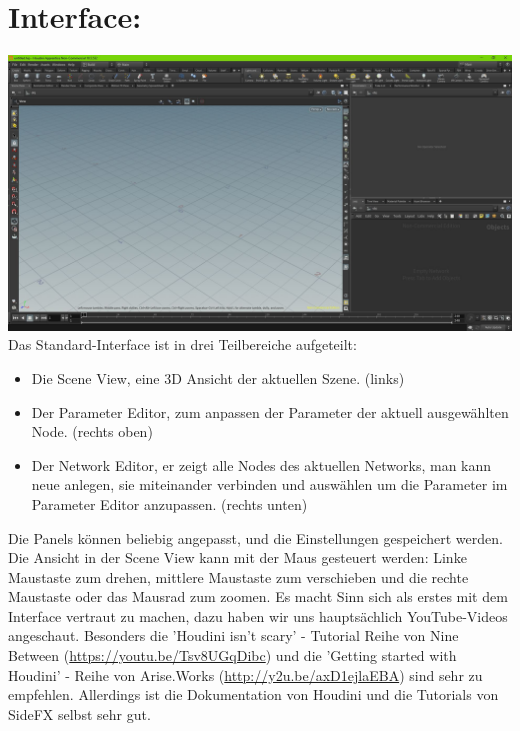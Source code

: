\documentclass[paper=a4,fontsize=12pt,ngerman]{scrartcl}
\begin{document}
	\section*{\textcolor{rosa}{Interface:}}
	\includegraphics[width=\textwidth]{graphics/Interface.jpg}
	Das Standard-Interface ist in drei Teilbereiche aufgeteilt: 
	\begin{itemize}
		\item Die Scene View, eine 3D Ansicht der aktuellen Szene. (links)
		\item Der Parameter Editor, zum anpassen der Parameter der aktuell ausgewählten Node. (rechts oben)
		\item Der Network Editor, er zeigt alle Nodes des aktuellen Networks, man kann neue anlegen, sie miteinander verbinden und auswählen um die Parameter im Parameter Editor anzupassen. (rechts unten)
	\end{itemize}
	Die Panels können beliebig angepasst, und die Einstellungen gespeichert werden. Die Ansicht in der Scene View kann mit der Maus gesteuert werden: Linke Maustaste zum drehen, mittlere Maustaste zum verschieben und die rechte Maustaste oder das Mausrad zum zoomen. Es macht Sinn sich als erstes mit dem Interface vertraut zu machen, dazu haben wir uns hauptsächlich YouTube-Videos angeschaut. Besonders die 'Houdini isn't scary' - Tutorial Reihe von Nine Between (\url{https://youtu.be/Tsv8UGqDibc}) und die 'Getting started with Houdini' - Reihe von Arise.Works (\url{http://y2u.be/axD1ejlaEBA}) sind sehr zu empfehlen. Allerdings ist die Dokumentation von Houdini und die Tutorials von SideFX selbst sehr gut.
	
\end{document}
